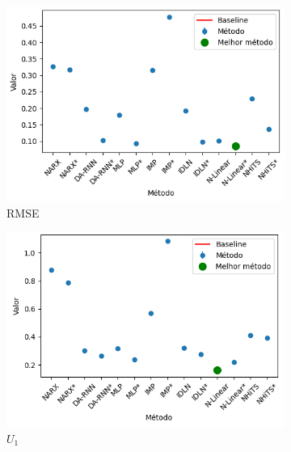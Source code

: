 \begin{figure}[htbp]
	\begin{subfigure}[b]{0.3\textwidth}
		\centering
		\includegraphics[width=\textwidth]{figuras/rmse_brasil_results_test.png}
		\caption{\ac{RMSE}}
		\label{fig:rmse_brasil_results_test}
	\end{subfigure}
	\hfill
	\begin{subfigure}[b]{0.3\textwidth}
		\centering
		\includegraphics[width=\textwidth]{figuras/u1_brasil_results_test.png}
		\caption{\(U_1\)}
		\label{fig:u1_brasil_results_test}
	\end{subfigure}
	\hfill
	\begin{subfigure}[b]{0.3\textwidth}
		\centering

\end{subfigure}
\end{figure}
